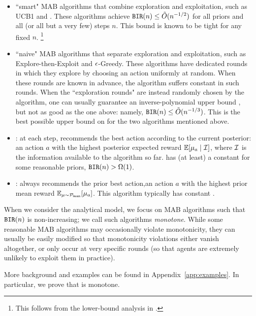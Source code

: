 \begin{itemize}
\item ``smart" MAB algorithms that combine exploration and exploitation, such as UCB1 \cite{bandits-ucb1} and . These algorithms achieve
        $\mathtt{BIR}(n) \leq  \tilde{O}(n^{-1/2})$
    for all priors and all (or all but a very few) steps $n$. This bound is known to be tight for any fixed $n$.
    \footnote{This follows from the lower-bound analysis in \cite{bandits-exp3}.}

\item ``naive" MAB algorithms that separate exploration and exploitation, such as Explore-then-Exploit and $\epsilon$-Greedy. These algorithms have dedicated rounds in which they explore by choosing an action uniformly at random. When these rounds are known in advance, the algorithm suffers constant \BIR in such rounds. When the ``exploration rounds" are instead randomly chosen by the algorithm, one can usually guarantee an inverse-polynomial upper bound \BIR, but not as good as the one above: namely,
        $ \mathtt{BIR}(n) \leq \tilde{O}(n^{-1/3})$.
    This is the best possible upper bound on \BIR for the two algorithms mentioned above.

\item \DynGreedy: at each step, recommends the best action according to the current posterior: an action $a$ with the highest posterior expected reward
        $\E[\mu_a \mid \mI]$,
     where $\mathcal{I}$ is the information available to the algorithm so far.
     \DynGreedy has (at least) a constant \BIR for some reasonable priors, \ie
        $\mathtt{BIR}(n)>\Omega(1)$.

\item \StaticGreedy: always recommends the prior best action,\ie an action $a$ with the highest prior mean reward  $\E_{\mu\sim \priorMu}[\mu_a]$. This algorithm typically has constant \BIR.
\end{itemize}

When we consider the analytical model, we focus on MAB algorithms such that $\mathtt{BIR}(n)$ is non-increasing; we call such algorithms \emph{monotone}. While some reasonable MAB algorithms may occasionally violate monotonicity, they can usually be easily modified so that monotonicity violations either vanish altogether, or only occur at very specific rounds (so that agents are extremely unlikely to exploit them in practice).

More background and examples can be found in Appendix~\ref{app:examples}. In particular, we prove that \DynGreedy is monotone.

